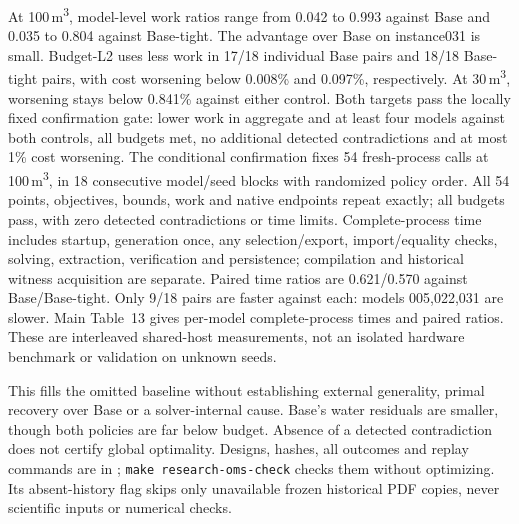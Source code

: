 \documentclass[11pt]{article}
\begin{document}
At 100\,m\textsuperscript{3}, model-level work ratios range from 0.042 to
0.993 against Base and 0.035 to 0.804 against Base-tight. The advantage over Base
on instance031 is small. Budget-L2 uses less work in 17/18 individual Base pairs
and 18/18 Base-tight pairs, with cost worsening below 0.008\% and 0.097\%,
respectively. At 30\,m\textsuperscript{3}, worsening stays below 0.841\% against
either control. Both targets pass the locally fixed confirmation gate: lower
work in aggregate and at least four models against both controls, all budgets
met, no additional detected contradictions and at most 1\% cost worsening.
The conditional confirmation fixes 54 fresh-process calls at
100\,m\textsuperscript{3}, in 18 consecutive model/seed blocks with randomized
policy order. All 54 points, objectives, bounds, work and native endpoints repeat
exactly; all budgets pass, with zero detected contradictions or time limits.
Complete-process time includes startup, generation once, any selection/export,
import/equality checks, solving, extraction, verification and persistence;
compilation and historical witness acquisition are separate. Paired time ratios
are 0.621/0.570 against Base/Base-tight. Only 9/18 pairs are faster against each:
models 005,022,031 are slower. Main Table~13 gives per-model complete-process
times and paired ratios. These are interleaved shared-host measurements,
not an isolated hardware benchmark or validation on unknown seeds.

This fills the omitted baseline without establishing external generality,
primal recovery over Base or a solver-internal cause. Base's water residuals are
smaller, though both policies are far below budget. Absence of a detected contradiction
does not certify global optimality. Designs, hashes, all outcomes and replay commands
are in ; \texttt{make research-oms-check}
checks them without optimizing. Its absent-history flag skips only unavailable
frozen historical PDF copies, never scientific inputs or numerical checks.

\FloatBarrier
\end{document}

